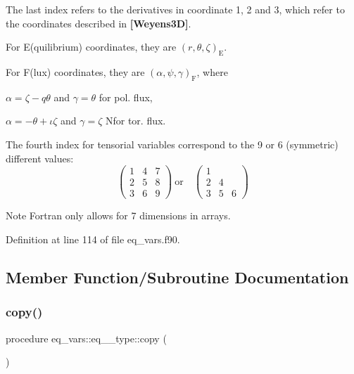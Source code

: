 The last index refers to the derivatives in coordinate 1, 2 and 3, which refer to the coordinates described in {\bfseries [Weyens3D]}.
\begin{DoxyItemize}
\item For E(quilibrium) coordinates, they are $\left(r,\theta,\zeta\right)_\text{E}$.
\item For F(lux) coordinates, they are $\left(\alpha,\psi,\gamma\right)_\text{F}$, where
\begin{DoxyItemize}
\item $\alpha = \zeta - q \theta$ and $\gamma = \theta$ for pol. flux,
\item $\alpha = -\theta + \iota \zeta$ and $\gamma = \zeta$ Nfor tor. flux.
\end{DoxyItemize}
\end{DoxyItemize}

The fourth index for tensorial variables correspond to the 9 or 6 (symmetric) different values\+: \[ \left( \begin{array}{ccc}1&4&7\\2&5&8\\3&6&9\end{array} \right) \ \text{or} \quad \left( \begin{array}{ccc}1& & \\2&4& \\3&5&6\end{array} \right) \]

\begin{DoxyNote}{Note}
Fortran only allows for 7 dimensions in arrays. 
\end{DoxyNote}


Definition at line 114 of file eq\+\_\+vars.\+f90.



\subsection{Member Function/\+Subroutine Documentation}
\mbox{\label{structeq__vars_1_1eq__2__type_a05c42f5918724fa397f69f992732813c}} 
\subsubsection{\texorpdfstring{copy()}{copy()}}
{\footnotesize\ttfamily procedure eq\+\_\+vars\+::eq\+\_\+\_\+type\+::copy (\begin{DoxyParamCaption}{ }\end{DoxyParamCaption})}




